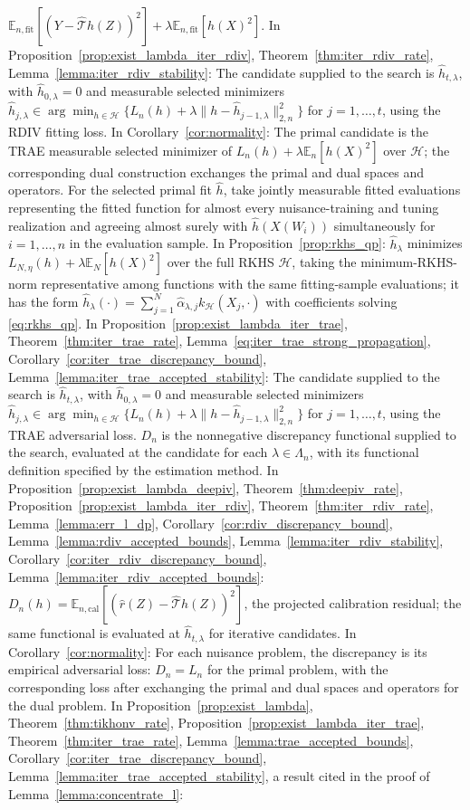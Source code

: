 \documentclass[12pt]{article}
\theoremstyle{plain}
\theoremstyle{definition}
\theoremstyle{remark}
\begin{document}
$\mathbb E_{n,\mathrm{fit}}[(Y-\hat{\mathcal T}h(Z))^2]+\lambda\mathbb E_{n,\mathrm{fit}}[h(X)^2]$. In Proposition~\ref{prop:exist_lambda_iter_rdiv}, Theorem~\ref{thm:iter_rdiv_rate}, Lemma~\ref{lemma:iter_rdiv_stability}: The candidate supplied to the search is $\hat h_{t,\lambda}$, with $\hat h_{0,\lambda}=0$ and measurable selected minimizers $\hat h_{j,\lambda}\in\arg\min_{h\in\mathcal H}\{L_n(h)+\lambda\|h-\hat h_{j-1,\lambda}\|_{2,n}^2\}$ for $j=1,\ldots,t$, using the RDIV fitting loss. In Corollary~\ref{cor:normality}: The primal candidate is the TRAE measurable selected minimizer of $L_n(h)+\lambda\mathbb E_n[h(X)^2]$ over $\mathcal H$; the corresponding dual construction exchanges the primal and dual spaces and operators. For the selected primal fit $\hat h$, take jointly measurable fitted evaluations representing the fitted function for almost every nuisance-training and tuning realization and agreeing almost surely with $\hat h(X(W_i))$ simultaneously for $i=1,\ldots,n$ in the evaluation sample. In Proposition~\ref{prop:rkhs_qp}: $\widehat h_\lambda$ minimizes $L_{N,\eta}(h)+\lambda\mathbb E_N[h(X)^2]$ over the full RKHS $\mathcal H$, taking the minimum-RKHS-norm representative among functions with the same fitting-sample evaluations; it has the form $\widehat h_\lambda(\cdot)=\sum_{j=1}^N\widehat\alpha_{\lambda,j}k_{\mathcal H}(X_j,\cdot)$ with coefficients solving \eqref{eq:rkhs_qp}. In Proposition~\ref{prop:exist_lambda_iter_trae}, Theorem~\ref{thm:iter_trae_rate}, Lemma~\ref{eq:iter_trae_strong_propagation}, Corollary~\ref{cor:iter_trae_discrepancy_bound}, Lemma~\ref{lemma:iter_trae_accepted_stability}: The candidate supplied to the search is $\hat h_{t,\lambda}$, with $\hat h_{0,\lambda}=0$ and measurable selected minimizers $\hat h_{j,\lambda}\in\arg\min_{h\in\mathcal H}\{L_n(h)+\lambda\|h-\hat h_{j-1,\lambda}\|_{2,n}^2\}$ for $j=1,\ldots,t$, using the TRAE adversarial loss. $D_n$ is the nonnegative discrepancy functional supplied to the search, evaluated at the candidate for each $\lambda\in\Lambda_n$, with its functional definition specified by the estimation method. In Proposition~\ref{prop:exist_lambda_deepiv}, Theorem~\ref{thm:deepiv_rate}, Proposition~\ref{prop:exist_lambda_iter_rdiv}, Theorem~\ref{thm:iter_rdiv_rate}, Lemma~\ref{lemma:err_l_dp}, Corollary~\ref{cor:rdiv_discrepancy_bound}, Lemma~\ref{lemma:rdiv_accepted_bounds}, Lemma~\ref{lemma:iter_rdiv_stability}, Corollary~\ref{cor:iter_rdiv_discrepancy_bound}, Lemma~\ref{lemma:iter_rdiv_accepted_bounds}: $D_n(h)=\mathbb E_{n,\mathrm{cal}}[(\hat r(Z)-\hat{\mathcal T}h(Z))^2]$, the projected calibration residual; the same functional is evaluated at $\hat h_{t,\lambda}$ for iterative candidates. In Corollary~\ref{cor:normality}: For each nuisance problem, the discrepancy is its empirical adversarial loss: $D_n=L_n$ for the primal problem, with the corresponding loss after exchanging the primal and dual spaces and operators for the dual problem. In Proposition~\ref{prop:exist_lambda}, Theorem~\ref{thm:tikhonv_rate}, Proposition~\ref{prop:exist_lambda_iter_trae}, Theorem~\ref{thm:iter_trae_rate}, Lemma~\ref{lemma:trae_accepted_bounds}, Corollary~\ref{cor:iter_trae_discrepancy_bound}, Lemma~\ref{lemma:iter_trae_accepted_stability}, a result cited in the proof of Lemma~\ref{lemma:concentrate_l}: 
\end{document}
